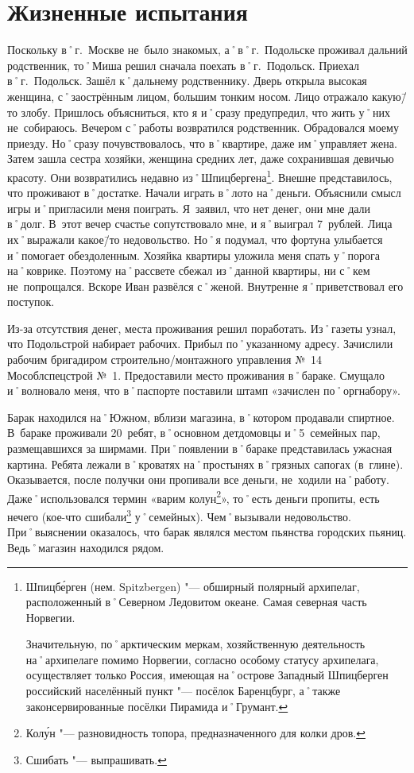 ﻿\chapter{Жизненные испытания}

Поскольку в˚г.~Москве не~было знакомых, а˚в˚г.~Подольске проживал дальний родственник, то˚Миша решил сначала поехать в˚г.~Подольск. Приехал в˚г.~Подольск. Зашёл к˚дальнему родственнику. Дверь открыла высокая женщина, с˚заострённым лицом, большим тонким носом. Лицо отражало какую\=/то злобу. Пришлось объясниться, кто я и˚сразу предупредил, что жить у˚них не~собираюсь. Вечером с˚работы возвратился родственник. Обрадовался моему приезду. Но˚сразу почувствовалось, что в˚квартире, даже им˚управляет жена. Затем зашла сестра хозяйки, женщина средних лет, даже сохранившая девичью красоту. Они возвратились недавно из˚Шпицбергена\footnote{Шпицб\'{е}рген (нем. Spitzbergen) "--- обширный полярный архипелаг, расположенный в˚Северном Ледовитом океане. Самая северная часть Норвегии. 

Значительную, по˚арктическим меркам, хозяйственную деятельность на˚архипелаге помимо Норвегии, согласно особому статусу архипелага, осуществляет только Россия, имеющая на˚острове Западный Шпицберген российский населённый пункт "--- посёлок Баренцбург, а˚также законсервированные посёлки Пирамида и˚Грумант.}. 
Внешне представилось, что проживают в˚достатке. Начали играть в˚лото на˚деньги. Объяснили смысл игры и˚пригласили меня поиграть. Я~заявил, что нет денег, они мне дали в˚долг. В~этот вечер счастье сопутствовало мне, и я˚выиграл 7~рублей. Лица их˚выражали какое\=/то недовольство. Но˚я подумал, что фортуна улыбается и˚помогает обездоленным. Хозяйка квартиры уложила меня спать у˚порога на˚коврике. Поэтому на˚рассвете сбежал из˚данной квартиры, ни с˚кем не~попрощался. Вскоре Иван развёлся с˚женой. Внутренне я˚приветствовал его поступок.

Из-за отсутствия денег, места проживания решил поработать. Из˚газеты узнал, что Подольстрой набирает рабочих. Прибыл по˚указанному адресу. Зачислили рабочим бригадиром строительно\-/монтажного управления №~14 Мособлспецстрой №~1. Предоставили место проживания в˚бараке. Смущало и˚волновало меня, что в˚паспорте поставили штамп «зачислен по˚оргнабору». 

Барак находился на˚Южном, вблизи магазина, в˚котором продавали спиртное. В~бараке проживали 20~ребят, в˚основном детдомовцы и˚5~семейных пар, размещавшихся за ширмами. При˚появлении в˚бараке представилась ужасная картина. Ребята лежали в˚кроватях на˚простынях в˚грязных сапогах (в~глине). Оказывается, после получки они пропивали все деньги, не~ходили на˚работу. Даже˚использовался термин «варим колун\footnote{Кол\'{у}н "--- разновидность топора, предназначенного для колки дров.}», то˚есть деньги пропиты, есть нечего (кое-что сшибали\footnote{Сшибать "--- выпрашивать.} у˚семейных). Чем˚вызывали недовольство. При˚выяснении оказалось, что барак являлся местом пьянства городских пьяниц. Ведь˚магазин находился рядом. 

